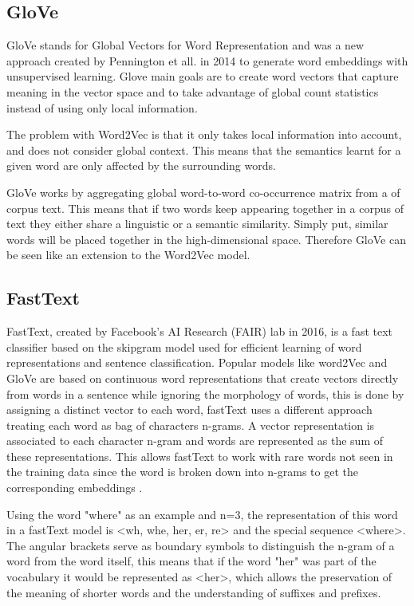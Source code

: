         \subsection{GloVe}
            \par GloVe stands for Global Vectors for Word Representation and was a new approach created by Pennington et all. in 2014 \cite{Pennington2014} to generate word embeddings with unsupervised learning. Glove main goals are to create word vectors that capture meaning in the vector space and to take advantage of global count statistics instead of using only local information. 
            \par The problem with Word2Vec is that it only takes local information into account, and does not consider global context. This means that the semantics learnt for a given word are only affected by the surrounding words. 
            \par GloVe works by aggregating global word-to-word co-occurrence matrix from a of corpus text. This means that if two words keep appearing together in a corpus of text they either share a linguistic or a semantic similarity. Simply put, similar words will be placed together in the high-dimensional space. Therefore GloVe can be seen like an extension to the Word2Vec model.

        \subsection{FastText}

        \par FastText, created by Facebook's AI Research (FAIR) lab in 2016, is a fast text classifier based on the skipgram model  used for efficient learning of word representations and sentence classification. Popular models like word2Vec and GloVe  are based on continuous word representations that create vectors directly from words in a sentence while ignoring the morphology of words, this is done by assigning a distinct vector to each word, fastText uses a different approach treating each word as bag of characters n-grams. A vector representation is associated to each character n-gram and words are represented as the sum of these representations. This allows fastText to work with rare words not seen in the training data since the word is broken down into n-grams to get the corresponding embeddings \cite{bojanowski2016enriching}.


        \par Using the word "where" as an example and n=3, the representation of this word in a fastText model is <wh, whe, her, er, re> and the special sequence <where>. The angular brackets serve as boundary symbols to distinguish the n-gram of a word from the word itself, this means that if the word "her" was part of the vocabulary it would be represented as <her>, which allows the preservation of the meaning of shorter words and the understanding of suffixes and prefixes.

